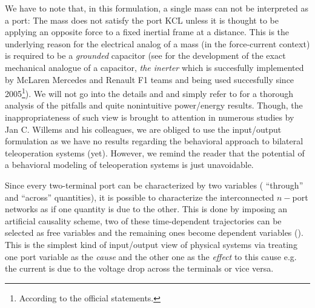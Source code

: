 \begin{rem}
We have to note that, in this formulation, a single mass can not be interpreted as a port: The mass does not satisfy the 
port KCL unless it is thought to be applying an opposite force to a fixed inertial frame at a distance. This is the underlying
reason for the electrical analog of a mass (in the force-current context) is required to be a \emph{grounded} capacitor 
(see \cite{smith} for the development of the exact mechanical analogue of a capacitor, \emph{the inerter} which is succesfully implemented by 
McLaren Mercedes and Renault F1 teams and being used succesfully since 2005\footnote{According to the official statements.}). We will not 
go into the details and and simply refer to \cite{willemsCSM} for a thorough analysis of the pitfalls and quite nonintuitive power/energy 
results. Though, the inappropriateness of such view is brought to attention in numerous studies by Jan C. Willems and his 
colleagues, we are obliged to use the input/output formulation as we have no results regarding the behavioral approach to bilateral 
teleoperation systems (yet). However, we remind the reader that the potential of a behavioral modeling of teleoperation systems
is just unavoidable. 
\end{rem}


Since every two-terminal port can be characterized by two variables ( ``through'' and ``across'' quantities), it is possible to 
characterize the interconnected $n-$port networks as if one quantity is due to the other. This is done by imposing an artificial 
causality scheme, two of these time-dependent trajectories can be selected as free variables and the remaining ones become dependent variables 
(\cite{behavbook}). This is the simplest kind of input/output view of physical systems via treating one port variable as the 
\emph{cause} and the other one as the \emph{effect} to this cause e.g. the current is due to the voltage drop across the terminals or 
vice versa. 

